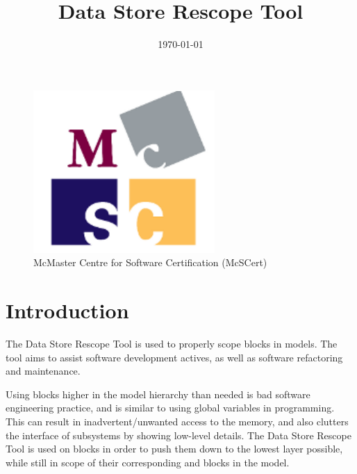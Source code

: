 \documentclass{article}
\makeatletter
\newcommand{\ToolName}{Data Store Rescope Tool\@\xspace}
\makeatother
\begin{document}
\title{\ToolName}
\date{\monthyeardate\today}
\maketitle
\vfill

\begin{figure}
	\centering
	\includegraphics[]{../figs/McSCert_Logo.pdf} \\
	McMaster Centre for Software Certification (McSCert)
\end{figure}

\newpage

\tableofcontents
\newpage

\section{Introduction}

The \ToolName is used to properly scope \DSM blocks in \Simulink models. The tool aims to assist software development actives, as well as software refactoring and maintenance.

Using \DSM blocks higher in the model hierarchy than needed is bad software engineering practice, and is similar to using global variables in programming. This can result in inadvertent/unwanted access to the memory, and also clutters the interface of subsystems by showing low-level details. The \ToolName is used on \DSM blocks in order to push them down to the lowest layer possible, while still in scope of their corresponding \DSR and \DSW blocks in the model.
\end{document}
